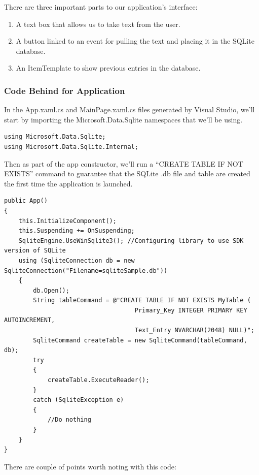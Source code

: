 There are three important parts to our application’s interface:

\begin{enumerate}
	\item A text box that allows us to take text from the user.
	\item A button linked to an event for pulling the text and placing it in the SQLite database.
	\item An ItemTemplate to show previous entries in the database.
\end{enumerate}

\subsubsection{Code Behind for Application}
In the App.xaml.cs and MainPage.xaml.cs files generated by Visual Studio, we’ll start by importing the Microsoft.Data.Sqlite namespaces that we’ll be using.

\begin{lstlisting}[style=CSharpStyle]
using Microsoft.Data.Sqlite;
using Microsoft.Data.Sqlite.Internal;
\end{lstlisting}

Then as part of the app constructor, we’ll run a “CREATE TABLE IF NOT EXISTS” command to guarantee that the SQLite .db file and table are created the first time the application is launched.

\begin{lstlisting}[style=CSharpStyle]
public App()
{
	this.InitializeComponent();
	this.Suspending += OnSuspending;
	SqliteEngine.UseWinSqlite3(); //Configuring library to use SDK version of SQLite
	using (SqliteConnection db = new SqliteConnection("Filename=sqliteSample.db"))
	{
		db.Open();
		String tableCommand = @"CREATE TABLE IF NOT EXISTS MyTable (
									Primary_Key INTEGER PRIMARY KEY AUTOINCREMENT, 
									Text_Entry NVARCHAR(2048) NULL)";
		SqliteCommand createTable = new SqliteCommand(tableCommand, db);
		try
		{
			createTable.ExecuteReader();
		}
		catch (SqliteException e)
		{
			//Do nothing
		}
	}
} 
\end{lstlisting}

There are couple of points worth noting with this code:

